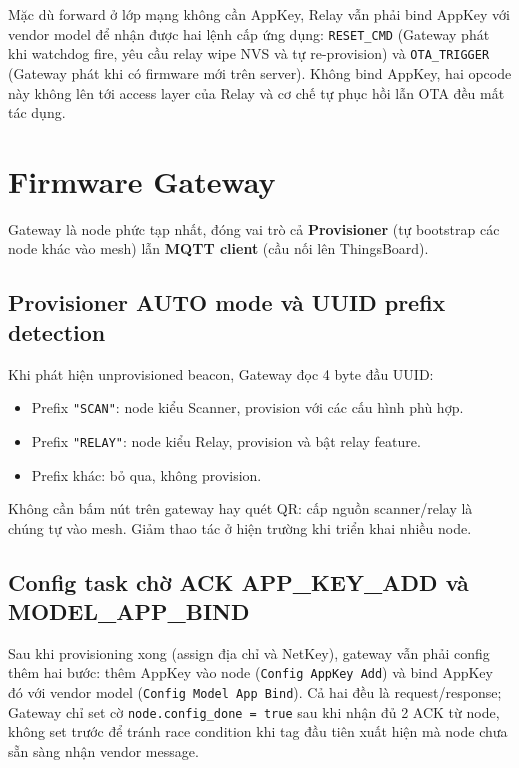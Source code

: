 Mặc dù forward ở lớp mạng không cần AppKey, Relay vẫn phải bind AppKey với vendor model để nhận được hai lệnh cấp ứng dụng: \texttt{RESET\_CMD} (Gateway phát khi watchdog fire, yêu cầu relay wipe NVS và tự re-provision) và \texttt{OTA\_TRIGGER} (Gateway phát khi có firmware mới trên server). Không bind AppKey, hai opcode này không lên tới access layer của Relay và cơ chế tự phục hồi lẫn OTA đều mất tác dụng.

\section{Firmware Gateway}

Gateway là node phức tạp nhất, đóng vai trò cả \textbf{Provisioner} (tự bootstrap các node khác vào mesh) lẫn \textbf{MQTT client} (cầu nối lên ThingsBoard).

\subsection{Provisioner AUTO mode và UUID prefix detection}

Khi phát hiện unprovisioned beacon, Gateway đọc 4 byte đầu UUID:

\begin{itemize}
    \item Prefix \texttt{"SCAN"}: node kiểu Scanner, provision với các cấu hình phù hợp.
    \item Prefix \texttt{"RELAY"}: node kiểu Relay, provision và bật relay feature.
    \item Prefix khác: bỏ qua, không provision.
\end{itemize}

Không cần bấm nút trên gateway hay quét QR: cấp nguồn scanner/relay là chúng tự vào mesh. Giảm thao tác ở hiện trường khi triển khai nhiều node.

\subsection{Config task chờ ACK APP\_KEY\_ADD và MODEL\_APP\_BIND}

Sau khi provisioning xong (assign địa chỉ và NetKey), gateway vẫn phải config thêm hai bước: thêm AppKey vào node (\texttt{Config AppKey Add}) và bind AppKey đó với vendor model (\texttt{Config Model App Bind}). Cả hai đều là request/response; Gateway chỉ set cờ \texttt{node.config\_done = true} sau khi nhận đủ 2 ACK từ node, không set trước để tránh race condition khi tag đầu tiên xuất hiện mà node chưa sẵn sàng nhận vendor message.

